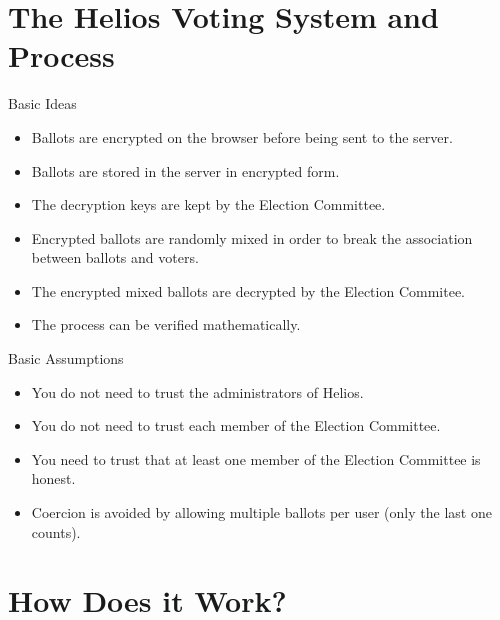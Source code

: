\documentclass[utf8]{beamer}
\begin{document}
\section{The Helios Voting System and Process}

\begin{frame}{Basic Ideas}

\begin{itemize}
\item Ballots are encrypted on the browser before being sent to the
  server.
\item Ballots are stored in the server in encrypted form.
\item The decryption keys are kept by the Election Committee.
\item Encrypted ballots are randomly mixed in order to break the
  association between ballots and voters.
\item The encrypted mixed ballots are decrypted by the Election
  Commitee.
\item The process can be verified mathematically.
\end{itemize}

\end{frame}

\begin{frame}{Basic Assumptions}

\begin{itemize}
\item You do not need to trust the administrators of Helios.
\item You do not need to trust each member of the Election Committee.
\item You need to trust that at least one member of the Election
  Committee is honest.
\item Coercion is avoided by allowing multiple ballots per user (only
  the last one counts).
\end{itemize}

\end{frame}

\section{How Does it Work?}
\end{document}
